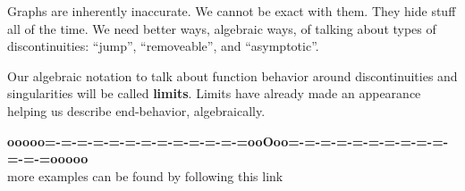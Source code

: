 \documentclass{ximera}
\begin{document}
\begin{notation}


Graphs are inherently inaccurate.  We cannot be exact with them.  They hide stuff all of the time. We need better ways, algebraic ways, of talking about types of discontinuities: ``jump'', ``removeable'', and ``asymptotic''.

Our algebraic notation to talk about function behavior around discontinuities and singularities will be called \textbf{\textcolor{purple!85!blue}{limits}}.  Limits have already made an appearance helping us describe end-behavior, algebraically.
\end{notation}





















\begin{center}
\textbf{\textcolor{green!50!black}{ooooo=-=-=-=-=-=-=-=-=-=-=-=-=ooOoo=-=-=-=-=-=-=-=-=-=-=-=-=ooooo}} \\

more examples can be found by following this link\\ 

\end{center}
\end{document}

